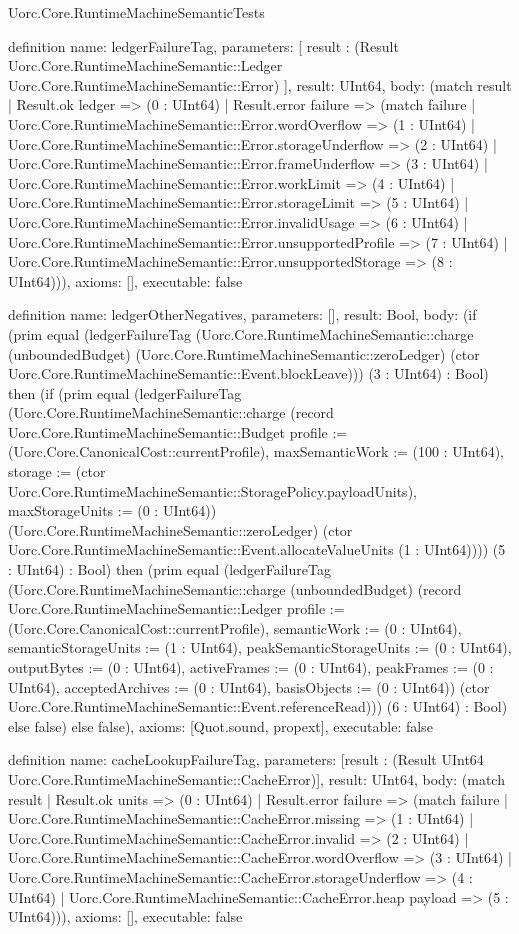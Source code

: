 \begin{lexlean}{Uorc.Core.RuntimeMachineSemanticTests}
\begin{semanticmodule}
definition{
  name: ledgerFailureTag,
  parameters: [
    result : (Result Uorc.Core.RuntimeMachineSemantic::Ledger Uorc.Core.RuntimeMachineSemantic::Error)
  ],
  result: UInt64,
  body: (match result
    | Result.ok ledger => (0 : UInt64)
    | Result.error failure => (match failure
      | Uorc.Core.RuntimeMachineSemantic::Error.wordOverflow => (1 : UInt64)
      | Uorc.Core.RuntimeMachineSemantic::Error.storageUnderflow => (2 : UInt64)
      | Uorc.Core.RuntimeMachineSemantic::Error.frameUnderflow => (3 : UInt64)
      | Uorc.Core.RuntimeMachineSemantic::Error.workLimit => (4 : UInt64)
      | Uorc.Core.RuntimeMachineSemantic::Error.storageLimit => (5 : UInt64)
      | Uorc.Core.RuntimeMachineSemantic::Error.invalidUsage => (6 : UInt64)
      | Uorc.Core.RuntimeMachineSemantic::Error.unsupportedProfile => (7 : UInt64)
      | Uorc.Core.RuntimeMachineSemantic::Error.unsupportedStorage => (8 : UInt64))),
  axioms: [],
  executable: false
}

definition{
  name: ledgerOtherNegatives,
  parameters: [],
  result: Bool,
  body: (if (prim equal (ledgerFailureTag (Uorc.Core.RuntimeMachineSemantic::charge (unboundedBudget) (Uorc.Core.RuntimeMachineSemantic::zeroLedger) (ctor Uorc.Core.RuntimeMachineSemantic::Event.blockLeave))) (3 : UInt64) : Bool) then (if (prim equal (ledgerFailureTag (Uorc.Core.RuntimeMachineSemantic::charge (record Uorc.Core.RuntimeMachineSemantic::Budget {profile := (Uorc.Core.CanonicalCost::currentProfile), maxSemanticWork := (100 : UInt64), storage := (ctor Uorc.Core.RuntimeMachineSemantic::StoragePolicy.payloadUnits), maxStorageUnits := (0 : UInt64)}) (Uorc.Core.RuntimeMachineSemantic::zeroLedger) (ctor Uorc.Core.RuntimeMachineSemantic::Event.allocateValueUnits (1 : UInt64)))) (5 : UInt64) : Bool) then (prim equal (ledgerFailureTag (Uorc.Core.RuntimeMachineSemantic::charge (unboundedBudget) (record Uorc.Core.RuntimeMachineSemantic::Ledger {profile := (Uorc.Core.CanonicalCost::currentProfile), semanticWork := (0 : UInt64), semanticStorageUnits := (1 : UInt64), peakSemanticStorageUnits := (0 : UInt64), outputBytes := (0 : UInt64), activeFrames := (0 : UInt64), peakFrames := (0 : UInt64), acceptedArchives := (0 : UInt64), basisObjects := (0 : UInt64)}) (ctor Uorc.Core.RuntimeMachineSemantic::Event.referenceRead))) (6 : UInt64) : Bool) else false) else false),
  axioms: [Quot.sound, propext],
  executable: false
}

definition{
  name: cacheLookupFailureTag,
  parameters: [result : (Result UInt64 Uorc.Core.RuntimeMachineSemantic::CacheError)],
  result: UInt64,
  body: (match result
    | Result.ok units => (0 : UInt64)
    | Result.error failure => (match failure
      | Uorc.Core.RuntimeMachineSemantic::CacheError.missing => (1 : UInt64)
      | Uorc.Core.RuntimeMachineSemantic::CacheError.invalid => (2 : UInt64)
      | Uorc.Core.RuntimeMachineSemantic::CacheError.wordOverflow => (3 : UInt64)
      | Uorc.Core.RuntimeMachineSemantic::CacheError.storageUnderflow => (4 : UInt64)
      | Uorc.Core.RuntimeMachineSemantic::CacheError.heap payload => (5 : UInt64))),
  axioms: [],
  executable: false
}


\end{semanticmodule}
\end{lexlean}
